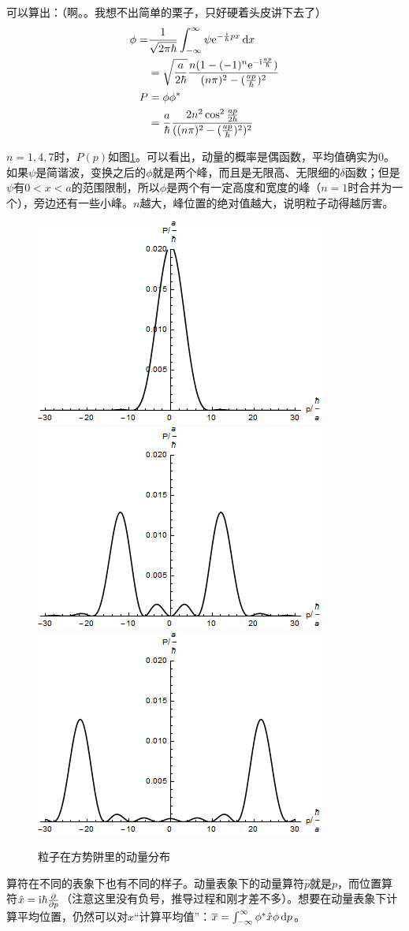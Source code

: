可以算出：（啊。。我想不出简单的栗子，只好硬着头皮讲下去了）
\begin{align*}
\phi=&\frac{1}{\sqrt{2 \pi \hbar}} \int_{-\infty}^{\infty} \psi \mathrm{e}^{-\frac{\mathrm{i}}{\hbar} p x} \mathop{}\!\mathrm{d} x \\
&=\sqrt{\frac{a}{2 \hbar}} \frac{n (1-(-1)^n \mathrm{e}^{-\mathrm{i} \frac{a p}{\hbar}})}{(n \pi)^2-(\frac{a p}{\hbar})^2} \\
P&=\phi \phi^* \\
&=\frac{a}{\hbar} \frac{2 n^2 \cos^2 \frac{a p}{2 \hbar}}{((n \pi)^2-(\frac{a p}{\hbar})^2)^2}
\end{align*}

$n=1,4,7$时，$P(p)$如图\ref{fig-square-well-p}。可以看出，动量的概率是偶函数，平均值确实为$0$。如果$\psi$是简谐波，变换之后的$\phi$就是两个峰，而且是无限高、无限细的$\delta$函数；但是$\psi$有$0<x<a$的范围限制，所以$\phi$是两个有一定高度和宽度的峰（$n=1$时合并为一个），旁边还有一些小峰。$n$越大，峰位置的绝对值越大，说明粒子动得越厉害。
\begin{figure}[htb]
\centering
\includegraphics[width=0.27\linewidth]{fig/square-well-p.png}
\includegraphics[width=0.27\linewidth]{fig/square-well-p-4.png}
\includegraphics[width=0.27\linewidth]{fig/square-well-p-7.png}
\caption{粒子在方势阱里的动量分布}
\label{fig-square-well-p}
\end{figure}

算符在不同的表象下也有不同的样子。动量表象下的动量算符$\hat{p}$就是$p$，而位置算符$\hat{x}=\mathrm{i} \hbar \frac{\partial}{\partial p}$（注意这里没有负号，推导过程和刚才差不多）。想要在动量表象下计算平均位置，仍然可以对$\hat{x}$“计算平均值”：$\overline{x}=\int_{-\infty}^{\infty} \phi^* \hat{x} \phi \mathop{}\!\mathrm{d} p$。


